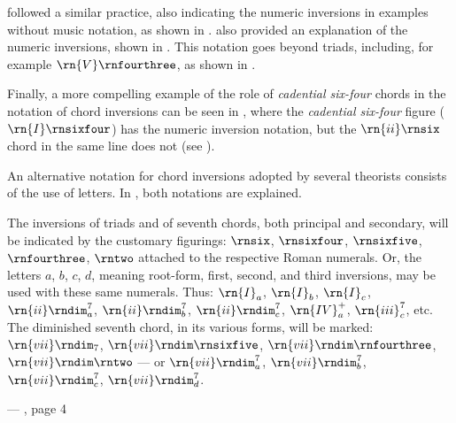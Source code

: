 

\textcite{chadwick1897harmony} followed a similar practice,
also indicating the numeric inversions in examples without
music notation, as shown in
.
\textcite{chadwick1897harmony} also provided an explanation
of the numeric inversions, shown in
. This
notation goes beyond triads, including, for example
$\rn{V}\rnfourthree$, as shown in
.

Finally, a more compelling example of the role of
\emph{cadential six-four} chords in the notation of chord
inversions can be seen in \textcite{loewengard1908lehrbuch},
where the \emph{cadential six-four} figure
($\rn{I}\rnsixfour$) has the numeric inversion notation, but
the $\rn{ii}\rnsix$ chord in the same line does not (see
).





An alternative notation for chord inversions adopted by
several theorists consists of the use of letters. In
\textcite{cutter1902harmonic}, both notations are explained.

\begin{italicquotes}
    The inversions of triads and of seventh chords, both
    principal and secondary, will be indicated by the
    customary figurings: $\rnsix$, $\rnsixfour$,
    $\rnsixfive$, $\rnfourthree$, $\rntwo$ attached to the
    respective Roman numerals. Or, the letters $a$, $b$,
    $c$, $d$, meaning root-form, first, second, and third
    inversions, may be used with these same numerals. Thus:
    $\rn{I}_a$, $\rn{I}_b$, $\rn{I}_c$, $\rn{ii}\rndim^7_a$,
    $\rn{ii}\rndim^7_b$, $\rn{ii}\rndim^7_c$, $\rn{IV}^+_a$,
    $\rn{iii}^7_c$, etc. The diminished seventh chord, in
    its various forms, will be marked: $\rn{vii}\rndim_7$,
    $\rn{vii}\rndim\rnsixfive$,
    $\rn{vii}\rndim\rnfourthree$, $\rn{vii}\rndim\rntwo$ ---
    or $\rn{vii}\rndim^7_a$, $\rn{vii}\rndim^7_b$,
    $\rn{vii}\rndim^7_c$, $\rn{vii}\rndim^7_d$.

    --- \textcite{cutter1902harmonic}, page 4
\end{italicquotes}

